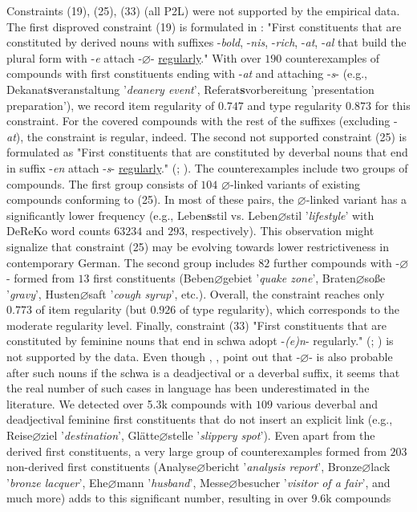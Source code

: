 \documentclass[10pt, a4paper]{article}
\newcommand{\zeroLinker}{\ensuremath{\boldsymbol{\varnothing}}}
\begin{document}
Constraints (19), (25), (33) (all P2L) were not supported by the empirical data. The first disproved constraint (19) is formulated in \citet[83, 107]{ortner_mueller-bollhagen_1991}: "First constituents that are constituted by derived nouns with suffixes -\textit{bold}, -\textit{nis}, -\textit{rich}, -\textit{at}, -\textit{al} that build the plural form with -\textit{e} attach \mbox{-{\zeroLinker}-} \underline{regularly}." With over $190$ counterexamples of compounds with first constituents ending with -\textit{at} and attaching \mbox{-\textit{s}-} (e.g., Dekanat\textbf{s}veranstaltung '\textit{deanery event}', Referat\textbf{s}vorbereitung 'presentation preparation'), we record item regularity of $0.747$ and type regularity $0.873$ for this constraint. For the covered compounds with the rest of the suffixes (excluding -\textit{at}), the constraint is regular, indeed. The second not supported constraint (25) is formulated as "First constituents that are constituted by deverbal nouns that end in suffix -\textit{en} attach \mbox{-\textit{s}-} \underline{regularly}." (\citealp[230]{eisenberg_2013}; \citealp[78]{nuebling_szczepaniak_2013}). The counterexamples include two groups of compounds. The first group consists of $104$ \mbox{{\zeroLinker}-linked} variants of existing compounds conforming to (25). In most of these pairs, the \mbox{{\zeroLinker}-linked} variant has a significantly lower frequency (e.g., Leben\textbf{s}stil vs. Leben{\zeroLinker}stil '\textit{lifestyle}' with DeReKo word counts $63234$ and $293$, respectively). This observation might signalize that constraint (25) may be evolving towards lower restrictiveness in contemporary German. The second group includes $82$ further compounds with \mbox{-{\zeroLinker}-} formed from $13$ first constituents (Beben{\zeroLinker}gebiet '\textit{quake zone}', Braten{\zeroLinker}soße '\textit{gravy}', Husten{\zeroLinker}saft '\textit{cough syrup}', etc.). Overall, the constraint reaches only $0.773$ of item regularity (but $0.926$ of type regularity), which corresponds to the moderate regularity level. Finally, constraint (33) "First constituents that are constituted by feminine nouns that end in schwa adopt -\textit{(e)n}- regularly." (\citealp[229]{eisenberg_2013}; \citealp[3]{krott_etal_2007}) is not supported by the data. Even though \citet[573]{fuhrhop_kuerschner_2015}, \citet[112]{kuerschner_2005}, \citet[93]{ortner_mueller-bollhagen_1991} point out that \mbox{-{\zeroLinker}-} is also probable after such nouns if the schwa is a deadjectival or a deverbal suffix, it seems that the real number of such cases in language has been underestimated in the literature. We detected over 5.3k compounds with $109$ various deverbal and deadjectival feminine first constituents that do not insert an explicit link (e.g., Reise{\zeroLinker}ziel '\textit{destination}', Glätte{\zeroLinker}stelle '\textit{slippery spot}'). Even apart from the derived first constituents, a very large group of counterexamples formed from $203$ non-derived first constituents (Analyse{\zeroLinker}bericht '\textit{analysis report}', Bronze{\zeroLinker}lack '\textit{bronze lacquer}', Ehe{\zeroLinker}mann '\textit{husband}', Messe{\zeroLinker}besucher '\textit{visitor of a fair}', and much more) adds to this significant number, resulting in over 9.6k compounds 
\end{document}
